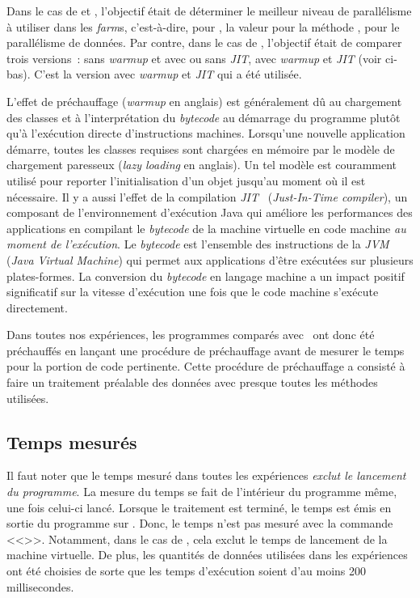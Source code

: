 Dans le cas de  et , l'objectif \'etait de d\'eterminer le meilleur niveau de parall\'elisme \`a utiliser dans les \emph{farm}s, c'est-\`a-dire, pour , la valeur pour la m\'ethode , pour le parall\'elisme de donn\'ees.
%
Par contre, dans le cas de , l'objectif était de comparer trois versions~: sans \emph{warmup} et avec ou sans \emph{JIT}, avec \emph{warmup} et \emph{JIT} (voir ci-bas).
%
C'est la version avec \emph{warmup} et \emph{JIT} qui a \'et\'e utilis\'ee.


L'effet de pr\'echauffage (\emph{warmup} en anglais) est g\'en\'eralement d\^u au chargement des classes et \`a l'interpr\'etation du \emph{bytecode} au d\'emarrage du programme plutôt qu'à l'exécution directe d'instructions machines. Lorsqu'une nouvelle application d\'emarre, toutes les classes requises sont charg\'ees en m\'emoire par le mod\`ele de chargement paresseux (\emph{lazy loading} en anglais). Un tel mod\`ele est couramment utilis\'e pour reporter l'initialisation d'un objet jusqu'au moment o\`u il est n\'ecessaire.
%
\label{jitDescription.sect}
%
Il y a aussi l'effet de la compilation 
\emph{JIT}~\citep{cramer1997compiling} (\emph{Just-In-Time compiler}),
%
un composant de l'environnement d'ex\'ecution Java qui am\'eliore les performances des applications en compilant le \emph{bytecode} de la machine virtuelle en code machine \emph{au moment de l'ex\'ecution}. Le \emph{bytecode} est l'ensemble des instructions de la \emph{JVM} (\emph{Java Virtual Machine}) qui permet aux applications d'\^etre ex\'ecut\'ees sur plusieurs plates-formes. La conversion du \emph{bytecode} en langage machine a un impact positif significatif sur la vitesse d'ex\'ecution une fois que le code machine s'exécute directement.

Dans toutes nos exp\'eriences, les programmes  comparés avec \ppff\ ont donc \'et\'e pr\'echauff\'es en lan\c{c}ant une proc\'edure de pr\'echauffage avant de mesurer le temps pour la portion de code pertinente. Cette proc\'edure de pr\'echauffage a consisté à faire un traitement préalable des données avec presque toutes les m\'ethodes utilis\'ees.

\subsection{Temps mesurés}
 
Il faut noter que le temps mesur\'e dans toutes les exp\'eriences \emph{exclut le lancement du programme}. La mesure du temps se fait de l'int\'erieur du programme m\^eme, une fois celui-ci lanc\'e. Lorsque le traitement est termin\'e, le temps est \'emis en sortie du programme sur . Donc, le temps n'est pas mesur\'e avec la commande <<>>. Notamment, dans le cas de , cela exclut le temps de lancement de la machine virtuelle. De plus, les quantit\'es de donn\'ees utilis\'ees dans les exp\'eriences ont \'et\'e choisies de sorte que les temps d'ex\'ecution soient d'au moins 200 millisecondes.


